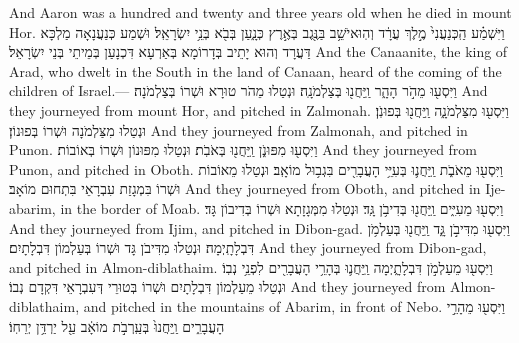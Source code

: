 {And Aaron was a hundred and twenty and three years old when he died in mount Hor.}{}
{וַיִּשְׁמַ֗ע הַֽכְּנַעֲנִי֙ מֶ֣לֶךְ עֲרָ֔ד וְהֽוּא\maqqaf יֹשֵׁ֥ב בַּנֶּ֖גֶב בְּאֶ֣רֶץ כְּנָ֑עַן בְּבֹ֖א בְּנֵ֥י יִשְׂרָאֵֽל׃}
{וּשְׁמַע כְּנַעֲנָאָה מַלְכָּא דַּעֲרָד וְהוּא יָתֵיב בְּדָרוֹמָא בְּאַרְעָא דִּכְנָעַן בְּמֵיתֵי בְּנֵי יִשְׂרָאֵל׃}
{And the Canaanite, the king of Arad, who dwelt in the South in the land of Canaan, heard of the coming of the children of Israel.—}{}
{וַיִּסְע֖וּ מֵהֹ֣ר הָהָ֑ר וַֽיַּחֲנ֖וּ בְּצַלְמֹנָֽה׃}
{וּנְטַלוּ מֵהֹר טוּרָא וּשְׁרוֹ בְּצַלְמֹנָה׃}
{And they journeyed from mount Hor, and pitched in Zalmonah.}{}
{וַיִּסְע֖וּ מִצַּלְמֹנָ֑ה וַֽיַּחֲנ֖וּ בְּפוּנֹֽן׃}
{וּנְטַלוּ מִצַּלְמֹנָה וּשְׁרוֹ בְּפוּנוֹן׃}
{And they journeyed from Zalmonah, and pitched in Punon.}{}
{וַיִּסְע֖וּ מִפּוּנֹ֑ן וַֽיַּחֲנ֖וּ בְּאֹבֹֽת׃}
{וּנְטַלוּ מִפּוּנוֹן וּשְׁרוֹ בְּאוֹבוֹת׃}
{And they journeyed from Punon, and pitched in Oboth.}{}
{וַיִּסְע֖וּ מֵאֹבֹ֑ת וַֽיַּחֲנ֛וּ בְּעִיֵּ֥י הָעֲבָרִ֖ים בִּגְב֥וּל מוֹאָֽב׃}
{וּנְטַלוּ מֵאוֹבוֹת וּשְׁרוֹ בִּמְגָזַת עִבְרָאֵי בִּתְחוּם מוֹאָב׃}
{And they journeyed from Oboth, and pitched in Ije-abarim, in the border of Moab.}{}
{וַיִּסְע֖וּ מֵעִיִּ֑ים וַֽיַּחֲנ֖וּ בְּדִיבֹ֥ן גָּֽד׃}
{וּנְטַלוּ מִמְּגָזָתָא וּשְׁרוֹ בְּדִיבוֹן גָּד׃}
{And they journeyed from Ijim, and pitched in Dibon-gad.}{}
{וַיִּסְע֖וּ מִדִּיבֹ֣ן גָּ֑ד וַֽיַּחֲנ֖וּ בְּעַלְמֹ֥ן דִּבְלָתָֽיְמָה׃}
{וּנְטַלוּ מִדִּיבֹן גָּד וּשְׁרוֹ בְּעַלְמוֹן דִּבְלָתָיִם׃}
{And they journeyed from Dibon-gad, and pitched in Almon-diblathaim.}{}
{וַיִּסְע֖וּ מֵעַלְמֹ֣ן דִּבְלָתָ֑יְמָה וַֽיַּחֲנ֛וּ בְּהָרֵ֥י הָעֲבָרִ֖ים לִפְנֵ֥י נְבֽוֹ׃}
{וּנְטַלוּ מֵעַלְמוֹן דִּבְלָתָיִם וּשְׁרוֹ בְּטוּרֵי דְּעִבְרָאֵי דִּקְדָם נְבוֹ׃}
{And they journeyed from Almon-diblathaim, and pitched in the mountains of Abarim, in front of Nebo.}{}
{וַיִּסְע֖וּ מֵהָרֵ֣י הָעֲבָרִ֑ים וַֽיַּחֲנוּ֙ בְּעַֽרְבֹ֣ת מוֹאָ֔ב עַ֖ל יַרְדֵּ֥ן יְרֵחֽוֹ׃}
